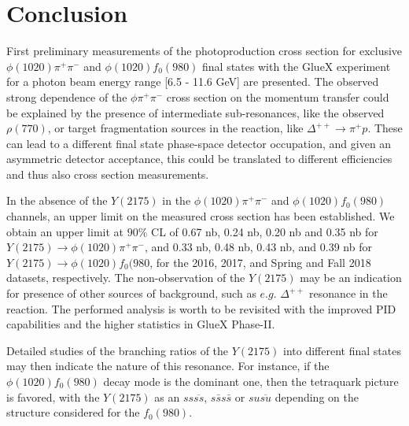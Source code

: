 \section{Conclusion}
\label{chap.y2175.conc}

First preliminary measurements of the photoproduction cross section for exclusive $\phi(1020) \pi^+\pi^-$ and $\phi(1020) f_0(980)$ final states with the GlueX experiment for a photon beam energy range [6.5 - 11.6 GeV] are presented. The observed strong dependence of the $\phi \pi^+\pi^-$ cross section on the momentum transfer could be explained by the presence of intermediate sub-resonances, like the observed $\rho(770)$, or target fragmentation sources in the reaction, like $\Delta^{++} \rightarrow \pi^+ p$. These can lead to a different final state phase-space detector occupation, and given an asymmetric detector acceptance, this could be translated to different efficiencies and thus also cross section measurements.
~\par In the absence of the $Y(2175)$ in the $\phi(1020) \pi^+\pi^-$ and $\phi(1020) f_0(980)$ channels, an upper limit on the measured cross section has been established. We obtain an upper limit at $90\%$ CL of 0.67 nb, 0.24 nb, 0.20 nb and 0.35 nb for $Y(2175)\rightarrow \phi(1020) \pi^+\pi^-$, and 0.33 nb, 0.48 nb, 0.43 nb, and 0.39 nb for $Y(2175)\rightarrow \phi(1020) f_0(980$, for the 2016, 2017, and Spring and Fall 2018 datasets, respectively. The non-observation of the $Y(2175)$ may be an indication for presence of other sources of background, such as $e.g.$ $\Delta^{++}$ resonance in the reaction. The performed analysis is worth to be revisited with the improved PID capabilities and the higher statistics in GlueX Phase-II.
~\par Detailed studies of the branching ratios of the $Y(2175)$ into different final states may then indicate the nature of this resonance. For instance, if the $\phi(1020) f_0(980)$ decay mode is the dominant one, then the tetraquark picture is favored, with the $Y(2175)$ as an $ss\overline{ss}$, $s\bar{s}s\bar{s}$ or $su\overline{su}$ depending on the structure considered for the $f_0(980)$.